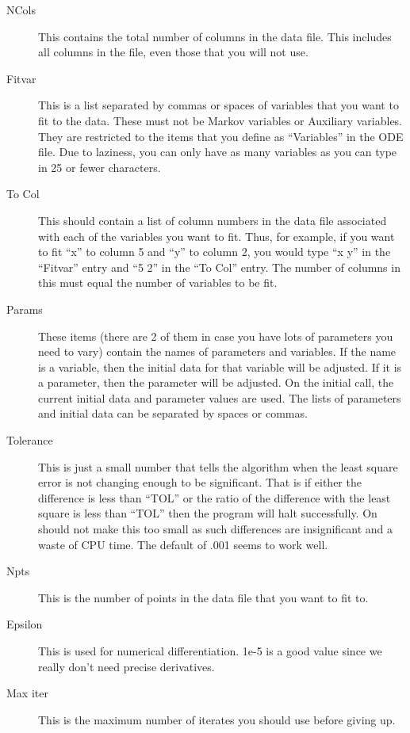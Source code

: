 \documentclass{article}
\begin{document}
\begin{description}
\begin{description}
\begin{description}
	\item[NCols] This contains the total number of columns in the
data file. This
includes all columns in the file, even those that you will not use.
       \item[Fitvar] This is a list separated by commas or spaces of
variables that you want to fit to the data.  These must not be Markov
variables or Auxiliary variables.  They are restricted to the items
that you define as ``Variables'' in the ODE file.  Due to laziness,
you can only have as many variables as you can type in 25 or fewer
characters.  
	\item[To Col]  This should contain a list of column numbers in
the data file associated with each of the variables you want to
fit. Thus, for example, if you want to fit ``x'' to column 5 and ``y''
to column 2, you would type ``x y'' in the ``Fitvar'' entry and ``5
2'' in the ``To Col'' entry. The number of columns in this must equal
the number of variables to be fit.
\item [Params]  These items (there are 2 of them in case you have lots
of parameters you need to vary) contain the names of parameters and
variables.  If the name is a variable, then the initial data for that
variable will be adjusted.  If it is a parameter, then the parameter
will be adjusted.  On the initial call, the current initial data and
parameter values are used. The lists of parameters and initial data
can be separated by spaces or commas.  
\item [Tolerance]  This is just a small number that tells the
algorithm when the least square error is not changing enough to be
significant.  That is if either the difference is less than ``TOL'' or
the ratio of the difference with the least square is less than ``TOL''
then the program will halt successfully.  On should not make this too
small as such differences are insignificant and a waste of CPU time.
The default of .001 seems to work well.
\item [Npts]  This is the number of points in the data file that you
want to fit to.  
\item [Epsilon]  This is used for numerical differentiation.  1e-5 is
a good value since we really don't need precise derivatives.
\item [Max iter] This is the maximum number of iterates you should use
before giving up.  
\end{description} 


\end{description}
\end{description}
\end{document}

